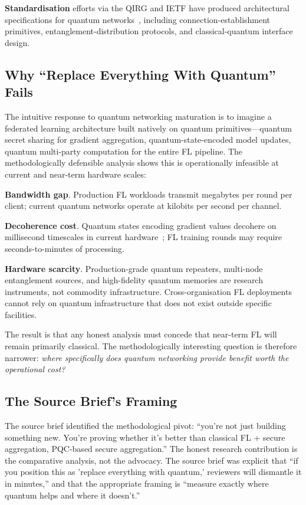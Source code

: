 \documentclass[sigconf,nonacm]{acmart}
\begin{document}
\textbf{Standardisation} efforts via the QIRG and IETF have
produced architectural specifications for quantum
networks~\cite{qirg2024arch}, including connection-establishment
primitives, entanglement-distribution protocols, and
classical-quantum interface design.

\subsection{Why ``Replace Everything With Quantum'' Fails}

The intuitive response to quantum networking maturation is to
imagine a federated learning architecture built natively on
quantum primitives---quantum secret sharing for gradient
aggregation, quantum-state-encoded model updates, quantum
multi-party computation for the entire FL pipeline. The
methodologically defensible analysis shows this is operationally
infeasible at current and near-term hardware scales:

\textbf{Bandwidth gap}. Production FL workloads transmit
megabytes per round per client; current quantum networks operate
at kilobits per second per channel.

\textbf{Decoherence cost}. Quantum states encoding gradient values
decohere on millisecond timescales in current
hardware~\cite{pompili2024entanglement}; FL training rounds may
require seconds-to-minutes of processing.

\textbf{Hardware scarcity}. Production-grade quantum repeaters,
multi-node entanglement sources, and high-fidelity quantum
memories are research instruments, not commodity infrastructure.
Cross-organisation FL deployments cannot rely on quantum
infrastructure that does not exist outside specific facilities.

The result is that any honest analysis must concede that
near-term FL will remain primarily classical. The methodologically
interesting question is therefore narrower:
\emph{where specifically does quantum networking provide benefit
worth the operational cost?}

\subsection{The Source Brief's Framing}

The source brief identified the methodological pivot: ``you're
not just building something new. You're proving whether it's
better than classical FL + secure aggregation, PQC-based secure
aggregation.'' The honest research contribution is the
comparative analysis, not the advocacy. The source brief was
explicit that ``if you position this as 'replace everything
with quantum,' reviewers will dismantle it in minutes,'' and
that the appropriate framing is ``measure exactly where quantum
helps and where it doesn't.''
\end{document}
